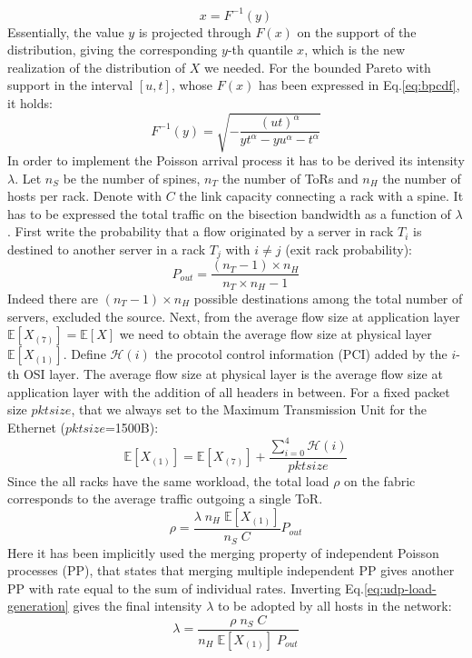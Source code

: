 \[
x = F^{-1}(y)
\]
Essentially, the value $y$ is projected through $F(x)$ on the support of the distribution, giving the corresponding $y$-th quantile $x$, which is the new realization of the distribution of $X$ we needed. For the bounded Pareto with support in the interval $[u,t]$, whose $F(x)$ has been expressed in Eq.\ref{eq:bpcdf}, it holds:
\[
F^{-1}(y) = \sqrt{-\dfrac{(ut)^\alpha}{yt^\alpha - yu^\alpha - t^\alpha}}
\]
In order to implement the Poisson arrival process it has to be derived its intensity $\lambda$. Let $n_S$ be the number of spines, $n_T$ the number of ToRs and $n_H$ the number of hosts per rack. Denote with $C$ the link capacity connecting a rack with a spine. It has to be expressed the total traffic on the bisection bandwidth as a function of $\lambda$. First write the probability that a flow originated by a server in rack $T_i$ is destined to another server in a rack $T_j$ with $i \neq j$ (exit rack probability):
\[
P_{out} = \frac{(n_T-1)\times n_H}{n_T \times n_H - 1}
\]
Indeed there are $(n_T-1)\times n_H$ possible destinations among the total number of servers, excluded the source. Next, from the average flow size at application layer $\mathbb{E}[X_{(7)}]=\mathbb{E}[X]$ we need to obtain the average flow size at physical layer $\mathbb{E}[X_{(1)}]$. Define $\mathcal{H}(i)$ the procotol control information (PCI) added by the $i$-th OSI layer. The average flow size at physical layer is the average flow size at application layer with the addition of all headers in between. For a fixed packet size $pktsize$, that we always set to the Maximum Transmission Unit for the Ethernet ($pktsize$=1500B):
\[
\mathbb{E}[X_{(1)}] = \mathbb{E}[X_{(7)}] + \dfrac{\sum_{i=0}^{4}\mathcal{H}(i)}{pktsize}
\]
Since the all racks have the same workload, the total load $\rho$ on the fabric corresponds to the average traffic outgoing a single ToR.
\begin{equation}
	\label{eq:udp-load-generation}
	\rho = \dfrac{\lambda \; n_H \; \mathbb{E}[X_{(1)}]}{n_S \; C} P_{out}
\end{equation} 
Here it has been implicitly used the merging property of independent Poisson processes (PP), that states that merging multiple independent PP gives another PP with rate equal to the sum of individual rates. Inverting Eq.\eqref{eq:udp-load-generation} gives the final intensity $\lambda$ to be adopted by all hosts in the network: 
\begin{equation}
	\label{eq:lambda}
	\lambda = \frac{\rho \; n_S \; C}{n_H \; \mathbb{E}[X_{(1)}] \; P_{out}}
\end{equation}
